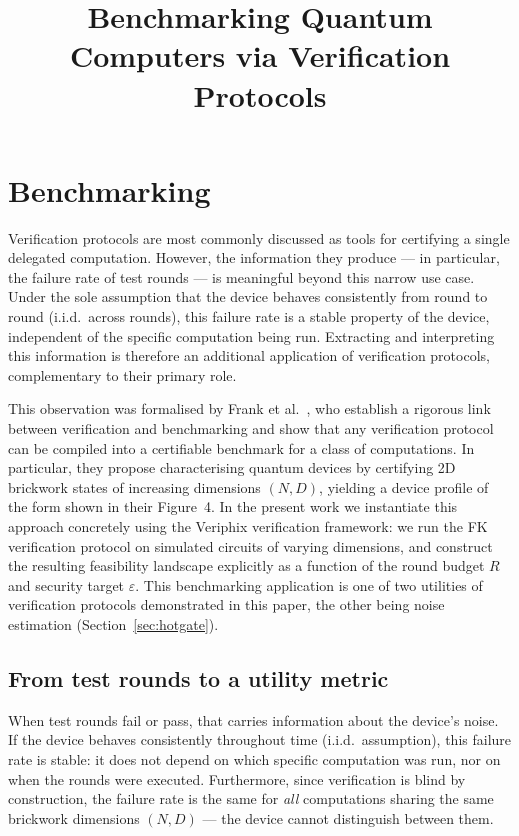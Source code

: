 \documentclass[]{article}
\title{Benchmarking Quantum Computers via Verification Protocols}
\author{}
\date{}
\begin{document}
\maketitle

\section{Benchmarking}
\label{sec:benchmarking}

Verification protocols are most commonly discussed as tools for certifying a
single delegated computation. However, the information they produce --- in
particular, the failure rate of test rounds --- is meaningful beyond this
narrow use case. Under the sole assumption that the device behaves consistently
from round to round (i.i.d.\ across rounds), this failure rate is a stable
property of the device, independent of the specific computation being run.
Extracting and interpreting this information is therefore an additional
application of verification protocols, complementary to their primary role.

This observation was formalised by Frank et al.~\cite{frank2024}, who establish
a rigorous link between verification and benchmarking and show that any
verification protocol can be compiled into a certifiable benchmark for a class
of computations. In particular, they propose characterising quantum devices by
certifying 2D brickwork states of increasing dimensions $(N, D)$, yielding a
device profile of the form shown in their Figure~4. In the present work we
instantiate this approach concretely using the Veriphix verification framework:
we run the FK verification protocol on simulated circuits of varying dimensions,
and construct the resulting feasibility landscape explicitly as a function of
the round budget $R$ and security target $\varepsilon$. This benchmarking
application is one of two utilities of verification protocols demonstrated in
this paper, the other being noise estimation (Section~\ref{sec:hotgate}).


\subsection{From test rounds to a utility metric}
\label{subsec:utility}

When test rounds fail or pass, that carries information about the device's
noise. If the device behaves consistently throughout time (i.i.d.\ assumption),
this failure rate is stable: it does not depend on which specific computation
was run, nor on when the rounds were executed. Furthermore, since verification
is blind by construction, the failure rate is the same for \emph{all}
computations sharing the same brickwork dimensions $(N, D)$ --- the device
cannot distinguish between them.
\end{document}
